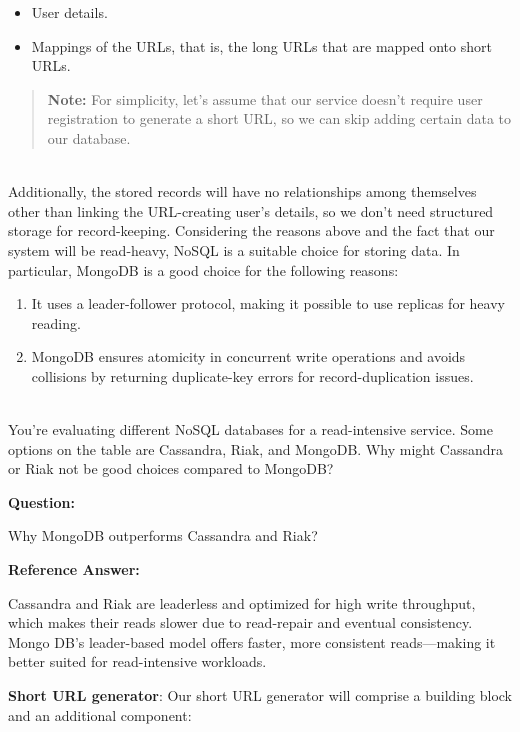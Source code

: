 \begin{itemize}
\item
\protect{}\label{U9QSri_i_lasgnD4C3IZs}
User details.
\item
\protect{}\label{Q61gECHSh197CDSGqTydw}
Mappings of the URLs, that is, the long URLs that are mapped onto short URLs.
\end{itemize}
\begin{quote}
\textbf{Note:} For simplicity, let's assume that our service doesn't require user registration to generate a short URL, so we can skip adding certain data to our database.
\end{quote}
\\
Additionally, the stored records will have no relationships among themselves other than linking the URL-creating user's details, so we don't need structured storage for record-keeping. Considering the reasons above and the fact that our system will be read-heavy, NoSQL is a suitable choice for storing data. In particular, MongoDB is a good choice for the following reasons:

\begin{enumerate}
\item
\protect{}\label{6zG4AtCvGJvGBxNEdT0Ga}
It uses a leader-follower protocol, making it possible to use replicas for heavy reading.
\item
\protect{}\label{O6vcMOVVOL1oAJyVXc-aq}
MongoDB ensures atomicity in concurrent write operations and avoids collisions by returning duplicate-key errors for record-duplication issues.
\end{enumerate}
\\
You're evaluating different NoSQL databases for a read-intensive service. Some options on the table are Cassandra, Riak, and MongoDB. Why might Cassandra or Riak not be good choices compared to MongoDB?

\textbf{Question:}

Why MongoDB outperforms Cassandra and Riak?

\textbf{Reference Answer:}

Cassandra and Riak are leaderless and optimized for high write throughput, which makes their reads slower due to read-repair and eventual consistency. Mongo DB's leader-based model offers faster, more consistent reads---making it better suited for read-intensive workloads.

\textbf{Short URL generator}: Our short URL generator will comprise a building block and an additional component:

